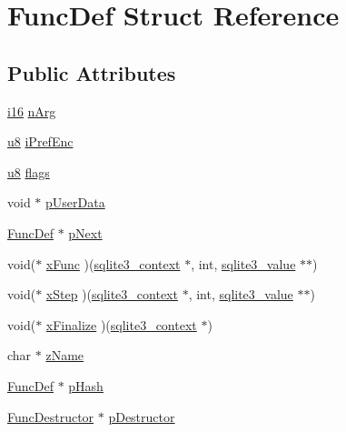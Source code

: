 \hypertarget{struct_func_def}{\section{Func\-Def Struct Reference}
\label{struct_func_def}
}
\subsection*{Public Attributes}
\begin{DoxyCompactItemize}
\item 
\hyperlink{sqlite3_8c_a7b32340f65cd15f029caad258fb3355c}{i16} \hyperlink{struct_func_def_a4ad90c05868ec8ee60c211b6e20299df}{n\-Arg}
\item 
\hyperlink{sqlite3_8c_a74a0f6424ae628af25f23f0a35f6ead3}{u8} \hyperlink{struct_func_def_aa7ed0a0a7d8790a4946ef0dbf85a601c}{i\-Pref\-Enc}
\item 
\hyperlink{sqlite3_8c_a74a0f6424ae628af25f23f0a35f6ead3}{u8} \hyperlink{struct_func_def_aed4dc88e58b7582668bcaf425c4d053f}{flags}
\item 
void $\ast$ \hyperlink{struct_func_def_a04fdde2f96be198823a483bebcfd3ae3}{p\-User\-Data}
\item 
\hyperlink{struct_func_def}{Func\-Def} $\ast$ \hyperlink{struct_func_def_a1ebe547d000172d9ae44d12eeb433a48}{p\-Next}
\item 
void($\ast$ \hyperlink{struct_func_def_a1cfd07fdfe22ff504ea7f36c0752c1da}{x\-Func} )(\hyperlink{structsqlite3__context}{sqlite3\-\_\-context} $\ast$, int, \hyperlink{sqlite3_8c_a5bc19e6eab34ccccd953717c04137d88}{sqlite3\-\_\-value} $\ast$$\ast$)
\item 
void($\ast$ \hyperlink{struct_func_def_ab1d1c623844534b17ea3ccce3f815464}{x\-Step} )(\hyperlink{structsqlite3__context}{sqlite3\-\_\-context} $\ast$, int, \hyperlink{sqlite3_8c_a5bc19e6eab34ccccd953717c04137d88}{sqlite3\-\_\-value} $\ast$$\ast$)
\item 
void($\ast$ \hyperlink{struct_func_def_a3c649453d5a58c697b7ee54ee999e7ef}{x\-Finalize} )(\hyperlink{structsqlite3__context}{sqlite3\-\_\-context} $\ast$)
\item 
char $\ast$ \hyperlink{struct_func_def_a1135e622a3a505c7c463e975846ef926}{z\-Name}
\item 
\hyperlink{struct_func_def}{Func\-Def} $\ast$ \hyperlink{struct_func_def_a04561444155a6922d6a2d99a29d35281}{p\-Hash}
\item 
\hyperlink{struct_func_destructor}{Func\-Destructor} $\ast$ \hyperlink{struct_func_def_a1bd12675375b838b5c00b1c79c1e6301}{p\-Destructor}
\end{DoxyCompactItemize}


